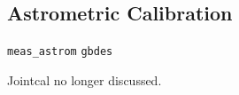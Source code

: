 \subsection{Astrometric Calibration}

\texttt{meas\_astrom}
\texttt{gbdes} \citep{2022ascl.soft10011B,2017PASP..129g4503B}

Jointcal no longer discussed.
